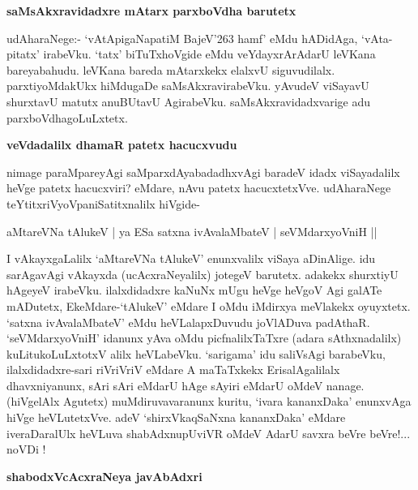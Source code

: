 {\bigskip
\noindent
{\large\bf saMsAkxravidadxre mAtarx parxboVdha barutetx}}\label{page124}
\medskip

\noindent
udAharaNege:- `vAtApigaNapatiM BajeV\char'263 hamf'\label{124a} eMdu hADidAga, `vAta-pitatx' irabeVku. `tatx' biTuTxhoVgide eMdu veYdayxrArAdarU leVKana bareyabahudu. leVKana bareda mAtarxkekx elalxvU siguvudilalx. parxtiyoMdakUkx hiMdugaDe saMsAkxravirabeVku. yAvudeV viSayavU shurxtavU matutx anuBUtavU AgirabeVku. saMsAkxravidadxvarige adu parxboVdhagoLuLxtetx.

{\bigskip
\noindent
{\large\bf veVdadalilx dhamaR patetx hacucxvudu}}\label{page124a}
\medskip

\noindent
nimage paraMpareyAgi saMparxdAyabadadhxvAgi baradeV idadx viSayadalilx heVge patetx hacucxviri? eMdare, nAvu patetx hacucxtetxVve. udAharaNege teYtitxriVyoVpaniSatitxnalilx hiVgide-

\begin{shloka}
aMtareVNa tAlukeV | ya ESa satxna ivAvalaMbateV | seVMdarxyoVniH ||\\\label{page124b}
\end{shloka}

I vAkayxgaLalilx `aMtareVNa tAlukeV' enunxvalilx viSaya aDinAlige. idu sarAgavAgi vAkayxda (ucAcxraNeyalilx) jotegeV barutetx. adakekx shurxtiyU hAgeyeV irabeVku. ilalxdidadxre kaNuNx mUgu heVge heVgoV Agi galATe mADutetx, EkeMdare-`tAlukeV' eMdare I oMdu iMdirxya meVlakekx oyuyxtetx. `satxna ivAvalaMbateV' eMdu heVLalapxDuvudu joVlADuva padAthaR. `seVMdarxyoVniH' idanunx yAva oMdu picfnalilxTaTxre (adara sAthxnadalilx) kuLitukoLuLxtotxV alilx heVLabeVku. `sarigama' idu saliVsAgi barabeVku, ilalxdidadxre-sari riVriVriV eMdare A maTaTxkekx ErisalAgalilalx dhavxniyanunx, sAri sAri eMdarU hAge sAyiri eMdarU oMdeV nanage. (hiVgelAlx Agutetx) muMdiruvavaranunx kuritu, `ivara kananxDaka' enunxvAga hiVge heVLutetxVve. adeV `shirxVkaqSaNxna kananxDaka' eMdare iveraDaralUlx heVLuva shabAdxnupUviVR oMdeV AdarU savxra beVre beVre!... noVDi !

{\bigskip
\noindent
{\large\bf shabodxVcAcxraNeya javAbAdxri}}\label{page124c}
\medskip


